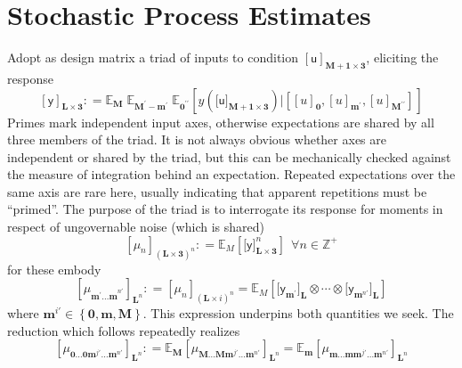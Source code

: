 \documentclass[preprint,12pt]{elsarticle}
\newcommand*{\M}[1]{\ensuremath{#1}\xspace}
\newcommand*{\x}{\times}
\newcommand*{\mi}[1]{\mathbf{#1}}
\newcommand*{\st}[1]{\mathbb{#1}}
\newcommand*{\rv}[1]{\mathsf{#1}}
\newcommand*{\te}[2][]{\left\lbrack{#2}\right\rbrack_{#1}}
\newcommand*{\tte}[2][]{\lbrack{#2}\rbrack_{#1}}
\newcommand*{\deq}{\M{\mathrel{\mathop:}=}}
\newcommand*{\ev}[3][]{\mathbb{E}_{#3}^{#1}\!\left\lbrack{#2}\right\rbrack}
\newcommand*{\evt}[3][]{\mathbb{E}_{#3}^{#1}\!#2}
\newcommand*{\set}[1]{\M{\left\lbrace{#1}\right\rbrace}}
\begin{document}
\section{Stochastic Process Estimates}\label{sec:SPEst}
    Adopt as design matrix a triad of inputs to condition $\te[\mi{M+1\x 3}]{\rv{u}}$, eliciting the response
    \begin{equation}\label{def:SPEst:y}
        \te[\mi{L\x 3}]{\rv{y}} \deq 
        \evt{\;\evt{\;\ev{y(\tte[\mi{M+1\x 3}]{\rv{u}}) 
            \big\vert \te[]{\te[\mi{0}]{u}, \te[\mi{m^{\prime}}]{u}, \te[\mi{M^{\prime\prime}}]{u}}}{\mi{0^{\prime\prime}}}}
        {\mi{M^{\prime}-m^{\prime}}}}{\mi{M}}
    \end{equation}
    Primes mark independent input axes, otherwise expectations are shared by all three members of the triad. It is not always obvious whether axes are independent or shared by the triad, but this can be mechanically checked against the measure of integration behind an expectation. Repeated expectations over the same axis are rare here, usually indicating that apparent repetitions must be ``primed''. The purpose of the triad is to interrogate its response for moments in respect of ungovernable noise (which is shared)
    \begin{equation}\label{def:SPEst:mu}
            \te[(\mi{L\x 3})^{n}]{\mu_{n}} \deq \ev{\tte[\mi{L\x 3}]{\rv{y}}^{n}}{M} \ \ \forall n \in \st{Z}^{+}
    \end{equation}
    for these embody
    \begin{equation*}
        \te[\mi{L}^{n}]{\mu_{\mi{m^{\prime}\ldots m}^{n\prime}}} \deq \te[(\mi{L\x}i)^{n}]{\mu_{n}} = \ev{\tte[\mi{L}]{\rv{y}_{\mi{m}^{\prime}}}\otimes\cdots\otimes\tte[\mi{L}]{\rv{y}_{\mi{m}^{n\prime}}}}{M}
    \end{equation*}
    where $\mi{m}^{i\prime} \in \set{\mi{0},\mi{m},\mi{M}}$. This expression underpins both quantities we seek. The reduction which follows repeatedly realizes
    \begin{equation}\label{eq:SPEstimates:reduction}
        \te[\mi{L}^{n}]{\mu_{\mi{0\ldots 0}\mi{m}^{j\prime}\mi{\ldots m}^{n\prime}}} \deq 
        \evt{\te[\mi{L}^{n}]{\mu_{\mi{M\ldots M}\mi{m}^{j\prime}\mi{\ldots m}^{n\prime}}}}{\mi{M}} = 
        \evt{\te[\mi{L}^{n}]{\mu_{\mi{m\ldots m}\mi{m}^{j\prime}\mi{\ldots m}^{n\prime}}}}{\mi{m}}
    \end{equation}
\end{document}
